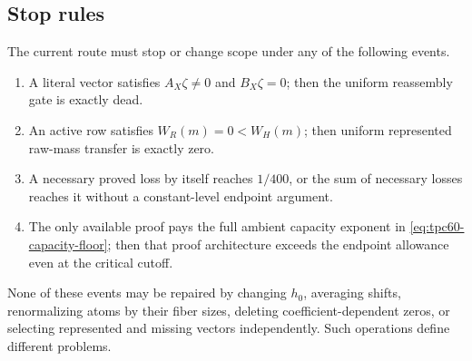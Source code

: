 \subsection{Stop rules}

The current route must stop or change scope under any of the following
events.
\begin{enumerate}[leftmargin=2.3em]
 \item A literal vector satisfies \(A_X\zeta\ne0\) and
       \(B_X\zeta=0\); then the uniform reassembly gate is exactly dead.
 \item An active row satisfies \(W_R(m)=0<W_H(m)\); then uniform
       represented raw-mass transfer is exactly zero.
 \item A necessary proved loss by itself reaches \(1/400\), or the sum of
       necessary losses reaches it without a constant-level endpoint
       argument.
 \item The only available proof pays the full ambient capacity exponent in
       \eqref{eq:tpc60-capacity-floor}; then that proof architecture exceeds
       the endpoint allowance even at the critical cutoff.
\end{enumerate}
None of these events may be repaired by changing \(h_0\), averaging shifts,
renormalizing atoms by their fiber sizes, deleting coefficient-dependent
zeros, or selecting represented and missing vectors independently.  Such
operations define different problems.
